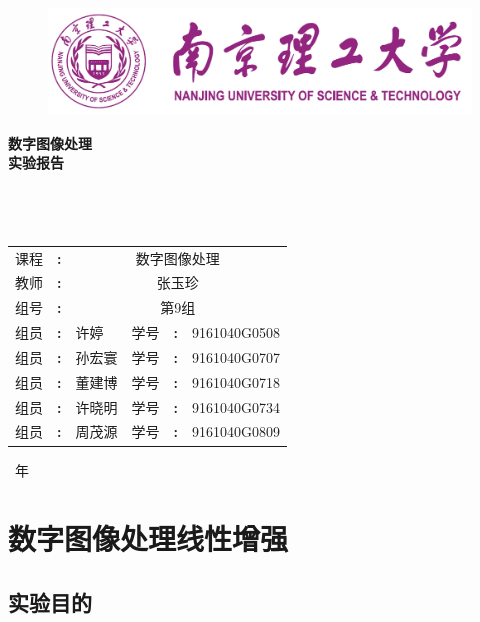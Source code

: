 \documentclass[12pt]{article}
\date{}
\renewcommand\figurename{\heiti\zihao{5} 图}
\renewcommand\tablename{\heiti\zihao{5} 表}
\begin{document}
\captionsetup{labelformat=default,labelsep=space}
\renewcommand{\contentsname}{\centering 目录}
\renewcommand\refname{参考文献}
\renewcommand\appendix{\setcounter{secnumdepth}{0}}
\renewcommand\abstractname{摘要}
\begin{figure}[h]
  \centering
  \includegraphics[width=.6\textwidth]{logo}
\end{figure}
\thispagestyle{empty}
\begin{center}
\begin{songti}
\textbf{数字图像处理}\\
\textbf{实验报告}\\\ \\\
\\ \
\renewcommand\arraystretch{1.5}
\begin{tabular}{p{1.5cm}<{\centering} p{0.2cm}<{\centering} p{3.5cm}<{\centering} p{1.5cm}<{\centering} p{0.2cm}<{\centering} p{3.5cm}<{\centering}}
课程&\textbf{:}&\multicolumn{4}{c}{数字图像处理}\\\cline{3-6}
教师&\textbf{:}&\multicolumn{4}{c}{张玉珍}\\\cline{3-6}
组号&\textbf{:}&\multicolumn{4}{c}{第9组}\\\cline{3-6}
组员&\textbf{:}&许婷&学号&\textbf{:}&9161040G0508\\\cline{3-3}\cline{6-6}
组员&\textbf{:}&孙宏寰&学号&\textbf{:}&9161040G0707\\\cline{3-3}\cline{6-6}
组员&\textbf{:}&董建博&学号&\textbf{:}&9161040G0718\\\cline{3-3}\cline{6-6}
组员&\textbf{:}&许晓明&学号&\textbf{:}&9161040G0734\\\cline{3-3}\cline{6-6}
组员&\textbf{:}&周茂源 &学号&\textbf{:}&9161040G0809\\\cline{3-3}\cline{6-6}
\end{tabular}

\begin{table}[b]
  \centering
\number\year\ 年\ \number{}
\end{table}

\end{songti}
\end{center}
\begin{center}
\newpage
{}
\newpage
\setcounter{page}{1}
\tableofcontents
\newpage
\setcounter{page}{1}

\end{center}

\setcounter{page}{1}
\section{数字图像处理线性增强}
\subsection{实验目的}
\end{document}
